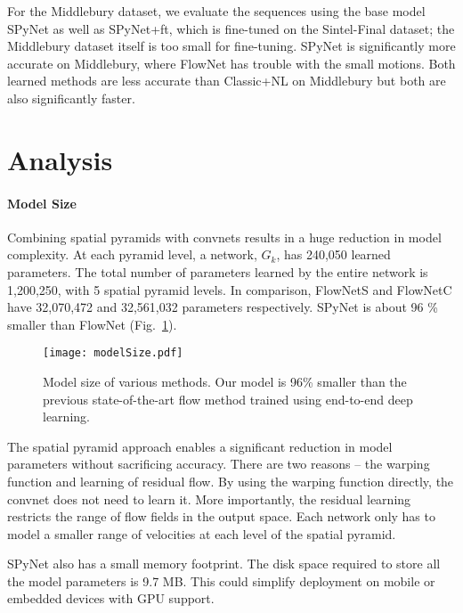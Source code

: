 \documentclass[10pt,twocolumn,letterpaper]{article}
\begin{document}
For the Middlebury \cite{baker2011database} dataset, we evaluate the sequences using the base model SPyNet
as well as SPyNet+ft,  which is fine-tuned on the  Sintel-Final dataset;  the Middlebury dataset itself is too small for fine-tuning. 
SPyNet is significantly more accurate on Middlebury, where FlowNet has trouble with the small motions.
Both learned methods are less accurate than Classic+NL on Middlebury but both are also significantly faster.



\section{Analysis}


\paragraph{Model Size}
Combining spatial pyramids with convnets results in a huge reduction in model complexity.
At each pyramid level, a network, $G_k$, has 240,050 learned parameters.
The total number of parameters learned by the entire network is 1,200,250, with 5 spatial pyramid levels.
In comparison, FlowNetS and FlowNetC \cite{dosovitskiy2015flownet} have 32,070,472 and 32,561,032 parameters respectively. 
SPyNet is about 96 \% smaller than FlowNet (Fig.~\ref{fig:modelSize}).
\begin{figure}[t]
\centerline{
   \texttt{[image: modelSize.pdf]}
}
   \caption{Model size of various methods. Our model is 96\% smaller
     than the previous state-of-the-art flow method trained using end-to-end deep learning.}
\label{fig:modelSize}
\end{figure}

The spatial pyramid approach enables a significant reduction in model parameters without sacrificing accuracy. 
There are two reasons -- the warping function and learning of residual flow. 
By using the warping function directly, the convnet does not need to
learn it. %
More importantly, the residual learning restricts the range of flow fields in the output space. 
Each network only has to model a smaller range of velocities at each level of the spatial pyramid. 

SPyNet also has a small memory footprint. 
The disk space required to store all the model parameters is 9.7
MB. 
This could simplify deployment on mobile or embedded devices with GPU support.
\end{document}
